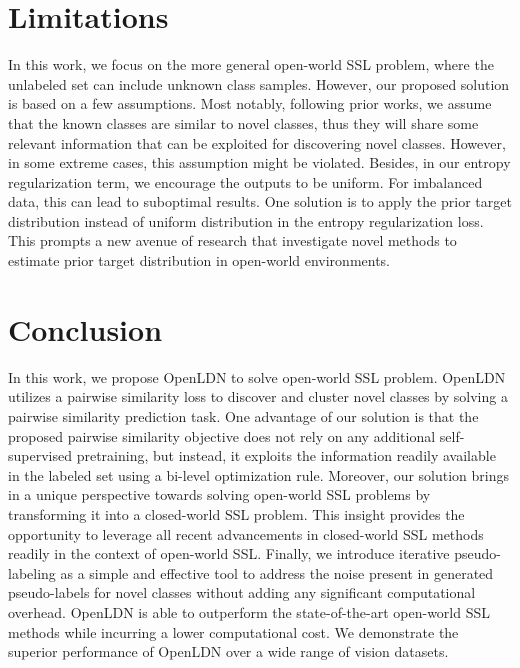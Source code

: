 \documentclass[runningheads]{eccv2022submission}
\begin{document}
\vspace{-2mm}
\section{Limitations}
\vspace{-2mm}
\label{para:discussion}
In this work, we focus on the more general open-world SSL problem, where the unlabeled set can include unknown class samples. However, our proposed solution is based on a few assumptions. Most notably, following prior works, we assume that the known classes are similar to novel classes, thus they will share some relevant information that can be exploited for discovering novel classes. However, in some extreme cases, this assumption might be violated. Besides, in our entropy regularization term, we encourage the outputs to be uniform. For imbalanced data, this can lead to suboptimal results. One solution is to apply the prior target distribution \cite{rizve2022towards} instead of uniform distribution in the entropy regularization loss. This prompts a new avenue of research that investigate novel methods to estimate prior target distribution in open-world environments.  


\vspace{-2mm}
\section{Conclusion}
\vspace{-2mm}
In this work, we propose OpenLDN to solve open-world SSL problem. OpenLDN utilizes a pairwise similarity loss to discover and cluster novel classes by solving a pairwise similarity prediction task. One advantage of our solution is that the proposed pairwise similarity objective does not rely on any additional self-supervised pretraining, but instead, it exploits the information readily available in the labeled set using a bi-level optimization rule. Moreover, our solution brings in a unique perspective towards solving open-world SSL problems by transforming it into a closed-world SSL problem. This insight provides the opportunity to leverage all recent advancements in closed-world SSL methods readily in the context of open-world SSL. Finally, we introduce iterative pseudo-labeling as a simple and effective tool to address the noise present in generated pseudo-labels for novel classes without adding any significant computational overhead. OpenLDN is able to outperform the state-of-the-art open-world SSL methods while incurring a lower computational cost. We demonstrate the superior performance of OpenLDN over a wide range of vision datasets.
\end{document}
